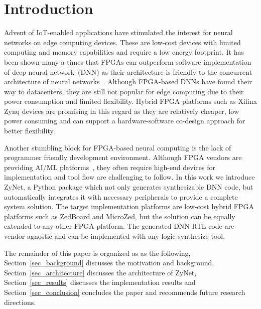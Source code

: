 \section{Introduction}
\label{sec:intro}

Advent of IoT-enabled applications have stimulated the interest for neural networks on edge computing devices.
These are low-cost devices with limited computing and memory capabilities and require a low energy footprint.
It has been shown many a times that FPGAs can outperform software implementation of deep neural network~(DNN) as their architecture is friendly to the concurrent architecture of neural networks~\cite{Huimin2016}.
Although FPGA-based DNNs have found their way to datacenters, they are still not popular for edge computing due to their power consumption and limited flexibility.
Hybrid FPGA platforms such as Xilinx Zynq devices are promising in this regard as they are relatively cheaper, low power consuming and can support a hardware-software co-design approach for better flexibility.

Another stumbling block for FPGA-based neural computing is the lack of programmer friendly development environment.
Although FPGA vendors are providing AI/ML platforms~\cite{xilinxddnk}, they often require high-end devices for implementation and tool flow are challenging to follow.
In this work we introduce ZyNet, a Python package which not only generates synthesizable DNN code, but automatically integrates it with necessary peripherals to provide a complete system solution.
The target implementation platforms are low-cost hybrid FPGA platforms such as ZedBoard and MicroZed, but the solution can be equally extended to any other FPGA platform.
The generated DNN RTL code are vendor agnostic and can be implemented with any logic synthesize tool.

The remainder of this paper is organized as as the following, Section~\ref{sec_background} discusses the motivation and background, Section~\ref{sec_architecture} discusses the architecture of ZyNet, Section~\ref{sec_results} discusses the implementation results and Section~\ref{sec_conclusion} concludes the paper and recommends future research directions.